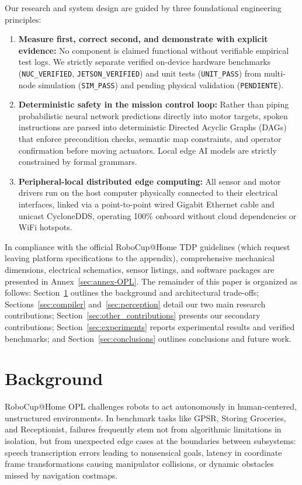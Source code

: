 \documentclass[runningheads,a4paper]{llncs}
\begin{document}
Our research and system design are guided by three foundational engineering principles:
\begin{enumerate}
    \item \textbf{Measure first, correct second, and demonstrate with explicit evidence:} No component is claimed functional without verifiable empirical test logs. We strictly separate verified on-device hardware benchmarks (\texttt{NUC\_VERIFIED}, \texttt{JETSON\_VERIFIED}) and unit tests (\texttt{UNIT\_PASS}) from multi-node simulation (\texttt{SIM\_PASS}) and pending physical validation (\texttt{PENDIENTE}).
    \item \textbf{Deterministic safety in the mission control loop:} Rather than piping probabilistic neural network predictions directly into motor targets, spoken instructions are parsed into deterministic Directed Acyclic Graphs (DAGs) that enforce precondition checks, semantic map constraints, and operator confirmation before moving actuators. Local edge AI models are strictly constrained by formal grammars.
    \item \textbf{Peripheral-local distributed edge computing:} All sensor and motor drivers run on the host computer physically connected to their electrical interfaces, linked via a point-to-point wired Gigabit Ethernet cable and unicast CycloneDDS, operating 100\% onboard without cloud dependencies or WiFi hotspots.
\end{enumerate}

In compliance with the official RoboCup@Home TDP guidelines (which request leaving platform specifications to the appendix), comprehensive mechanical dimensions, electrical schematics, sensor listings, and software packages are presented in Annex~\ref{sec:annex-OPL}. The remainder of this paper is organized as follows: Section~\ref{sec:background} outlines the background and architectural trade-offs; Sections~\ref{sec:compiler} and~\ref{sec:perception} detail our two main research contributions; Section~\ref{sec:other_contributions} presents our secondary contributions; Section~\ref{sec:experiments} reports experimental results and verified benchmarks; and Section~\ref{sec:conclusions} outlines conclusions and future work.

\section{Background}
\label{sec:background}
RoboCup@Home OPL challenges robots to act autonomously in human-centered, unstructured environments. In benchmark tasks like GPSR, Storing Groceries, and Receptionist, failures frequently stem not from algorithmic limitations in isolation, but from unexpected edge cases at the boundaries between subsystems: speech transcription errors leading to nonsensical goals, latency in coordinate frame transformations causing manipulator collisions, or dynamic obstacles missed by navigation costmaps.
\end{document}
